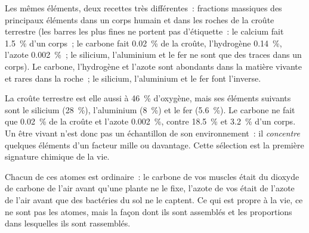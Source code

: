 \begin{omfigure}

{\small Les mêmes éléments, deux recettes très différentes~: fractions
massiques des principaux éléments dans un corps humain et dans les
roches de la croûte terrestre (les barres les plus fines ne portent pas
d'étiquette~: le calcium fait 1.5~\% d'un corps~; le carbone fait
0.02~\% de la croûte, l'hydrogène 0.14~\%, l'azote 0.002~\%~; le
silicium, l'aluminium et le fer ne sont que des traces dans un corps).
Le carbone, l'hydrogène et l'azote sont abondants dans la matière
vivante et rares dans la roche~; le silicium, l'aluminium et le fer
font l'inverse.}
\end{omfigure}

\begin{example}\label{ex:g10:chemistry-of-life:crust}
La croûte terrestre est elle aussi à 46~\% d'oxygène, mais ses éléments
suivants sont le silicium (28~\%), l'aluminium (8~\%) et le fer
(5.6~\%). Le carbone ne fait que 0.02~\% de la croûte et l'azote
0.002~\%, contre 18.5~\% et 3.2~\% d'un corps. Un être vivant n'est
donc pas un échantillon de son environnement~: il \emph{concentre}
quelques éléments d'un facteur mille ou davantage. Cette sélection est
la première signature chimique de la vie.
\end{example}

\begin{remark}\label{rem:g10:chemistry-of-life:origin}
Chacun de ces atomes est ordinaire~: le carbone de vos muscles était
du dioxyde de carbone de l'air avant qu'une plante ne le fixe, l'azote
de vos  était de l'azote de l'air avant que des bactéries du
sol ne le captent. Ce qui est propre à la vie, ce ne sont pas les
atomes, mais la façon dont ils sont assemblés et les proportions dans
lesquelles ils sont rassemblés.
\end{remark}

